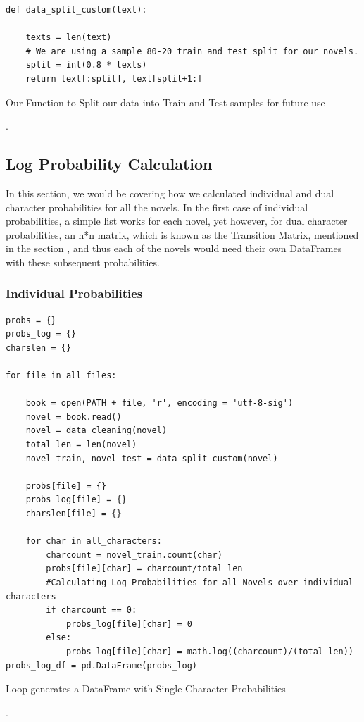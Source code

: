 \begin{code}
\label{code:data-split}
\begin{verbatim}
def data_split_custom(text):
    
    texts = len(text)
    # We are using a sample 80-20 train and test split for our novels. 
    split = int(0.8 * texts)
    return text[:split], text[split+1:]
\end{verbatim}
\caption{Our Function to Split our data into Train and Test samples for future use}.
\end{code}

\subsection{Log Probability Calculation}
\label{sec:log-probability-code}

In this section, we would be covering how we calculated individual and dual character probabilities for all the novels. In the first case of individual probabilities, a simple list works for each novel, yet however, for dual character probabilities, an n*n matrix, which is known as the Transition Matrix, mentioned in the section \label{sec:discrete-space-markov-chains}, and thus each of the novels would need their own DataFrames with these subsequent probabilities.

\subsubsection{Individual Probabilities}
\label{sec:individual-char-probs}
\vspace{0.5cm}

\begin{code}
\label{code:single-char-prob}
\begin{verbatim}
probs = {}
probs_log = {}
charslen = {}

for file in all_files:
            
    book = open(PATH + file, 'r', encoding = 'utf-8-sig')       
    novel = book.read()
    novel = data_cleaning(novel)
    total_len = len(novel)
    novel_train, novel_test = data_split_custom(novel)
    
    probs[file] = {}
    probs_log[file] = {}
    charslen[file] = {}
    
    for char in all_characters:
        charcount = novel_train.count(char)
        probs[file][char] = charcount/total_len
        #Calculating Log Probabilities for all Novels over individual characters
        if charcount == 0:
            probs_log[file][char] = 0
        else:
            probs_log[file][char] = math.log((charcount)/(total_len))
probs_log_df = pd.DataFrame(probs_log)    
\end{verbatim}
\caption{Loop generates a DataFrame with Single Character Probabilities}.
\end{code}

